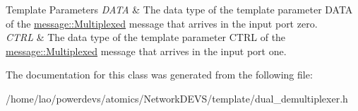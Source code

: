 \begin{DoxyTemplParams}{Template Parameters}
{\em D\+A\+TA} & The data type of the template parameter D\+A\+TA of the \hyperlink{structmessage_1_1Multiplexed}{message\+::\+Multiplexed} message that arrives in the input port zero. \\
\hline
{\em C\+T\+RL} & The data type of the template parameter C\+T\+RL of the \hyperlink{structmessage_1_1Multiplexed}{message\+::\+Multiplexed} message that arrives in the input port one. \\
\hline
\end{DoxyTemplParams}


The documentation for this class was generated from the following file\+:\begin{DoxyCompactItemize}
\item 
/home/lao/powerdevs/atomics/\+Network\+D\+E\+V\+S/template/dual\+\_\+demultiplexer.\+h\end{DoxyCompactItemize}

